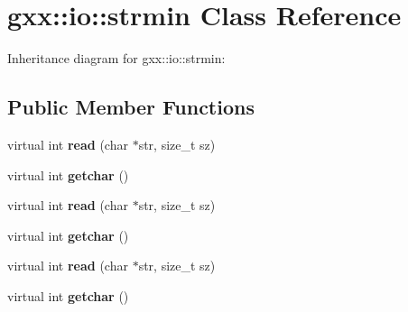 \hypertarget{classgxx_1_1io_1_1strmin}{}\section{gxx\+:\+:io\+:\+:strmin Class Reference}
\label{classgxx_1_1io_1_1strmin}


Inheritance diagram for gxx\+:\+:io\+:\+:strmin\+:
\subsection*{Public Member Functions}
\begin{DoxyCompactItemize}
\item 
virtual int {\bfseries read} (char $\ast$str, size\+\_\+t sz)\hypertarget{classgxx_1_1io_1_1strmin_a64c5aa687cbf8b1715122c41379ecf2c}{}\label{classgxx_1_1io_1_1strmin_a64c5aa687cbf8b1715122c41379ecf2c}

\item 
virtual int {\bfseries getchar} ()\hypertarget{classgxx_1_1io_1_1strmin_a40b6a0e90d6c0f38c8ca752df61028c2}{}\label{classgxx_1_1io_1_1strmin_a40b6a0e90d6c0f38c8ca752df61028c2}

\item 
virtual int {\bfseries read} (char $\ast$str, size\+\_\+t sz)\hypertarget{classgxx_1_1io_1_1strmin_a64c5aa687cbf8b1715122c41379ecf2c}{}\label{classgxx_1_1io_1_1strmin_a64c5aa687cbf8b1715122c41379ecf2c}

\item 
virtual int {\bfseries getchar} ()\hypertarget{classgxx_1_1io_1_1strmin_a40b6a0e90d6c0f38c8ca752df61028c2}{}\label{classgxx_1_1io_1_1strmin_a40b6a0e90d6c0f38c8ca752df61028c2}

\item 
virtual int {\bfseries read} (char $\ast$str, size\+\_\+t sz)\hypertarget{classgxx_1_1io_1_1strmin_a64c5aa687cbf8b1715122c41379ecf2c}{}\label{classgxx_1_1io_1_1strmin_a64c5aa687cbf8b1715122c41379ecf2c}

\item 
virtual int {\bfseries getchar} ()\hypertarget{classgxx_1_1io_1_1strmin_a40b6a0e90d6c0f38c8ca752df61028c2}{}\label{classgxx_1_1io_1_1strmin_a40b6a0e90d6c0f38c8ca752df61028c2}

\end{DoxyCompactItemize}
